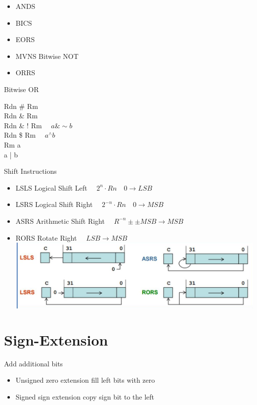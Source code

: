 \documentclass[10pt]{article}
\begin{document}
\begin{itemize}
  \item ANDS
  \item BICS
  \item EORS
  \item MVNS Bitwise NOT
  \item ORRS
\end{itemize}

Bitwise OR

Rdn \# Rm\\
Rdn \& Rm\\
Rdn \& ! Rm $\quad a \& \sim b$\\
Rdn \$ Rm $\quad a{ }^{\wedge} b$\\
Rm a\\
a | b

Shift Instructions

\begin{itemize}
  \item LSLS Logical Shift Left $\quad 2^{n} \cdot R n \quad 0 \rightarrow L S B$
  \item LSRS Logical Shift Right $\quad 2^{-n} \cdot R n \quad 0 \rightarrow M S B$
  \item ASRS Arithmetic Shift Right $\quad R^{-n} \pm \pm M S B \rightarrow M S B$
  \item RORS Rotate Right $\quad L S B \rightarrow M S B$\\
\includegraphics[width=\linewidth]{images/2024_12_29_79e6b22f503fb7b4f718g-06}
\end{itemize}

\section*{Sign-Extension}
Add additional bits

\begin{itemize}
  \item Unsigned zero extension fill left bits with zero
  \item Signed sign extension copy sign bit to the left
\end{itemize}
\end{document}
